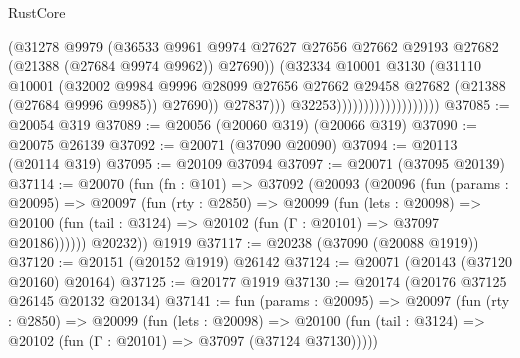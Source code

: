 \begin{lexlean}{RustCore}
\begin{coremodule}
                                              (@31278
                                                @9979
                                                (@36533
                                                  @9961
                                                  @9974
                                                  @27627
                                                  @27656
                                                  @27662
                                                  @29193
                                                  @27682
                                                  (@21388 (@27684 @9974 @9962))
                                                  @27690))
                                              (@32334
                                                @10001
                                                @3130
                                                (@31110
                                                  @10001
                                                  (@32002
                                                    @9984
                                                    @9996
                                                    @28099
                                                    @27656
                                                    @27662
                                                    @29458
                                                    @27682
                                                    (@21388 (@27684 @9996 @9985))
                                                    @27690))
                                                @27837)))
                                          @32253)))))))))))))))))))
@37085 := @20054 @319
@37089 := @20056 (@20060 @319) (@20066 @319)
@37090 := @20075 @26139
@37092 := @20071 (@37090 @20090)
@37094 := @20113 (@20114 @319)
@37095 := @20109 @37094
@37097 := @20071 (@37095 @20139)
@37114 := @20070
    (fun (fn : @101) =>
    @37092
      (@20093
        (@20096
          (fun (params : @20095) =>
          @20097
            (fun (rty : @2850) =>
            @20099
              (fun (lets : @20098) =>
              @20100 (fun (tail : @3124) => @20102 (fun (Γ : @20101) => @37097 @20186))))))
        @20232))
    @1919
@37117 := @20238 (@37090 (@20088 @1919))
@37120 := @20151 (@20152 @1919) @26142
@37124 := @20071 (@20143 (@37120 @20160) @20164)
@37125 := @20177 @1919
@37130 := @20174 (@20176 @37125 @26145 @20132 @20134)
@37141 := fun (params : @20095) =>
  @20097
    (fun (rty : @2850) =>
    @20099
      (fun (lets : @20098) =>
      @20100 (fun (tail : @3124) => @20102 (fun (Γ : @20101) => @37097 (@37124 @37130)))))

\end{coremodule}
\end{lexlean}
